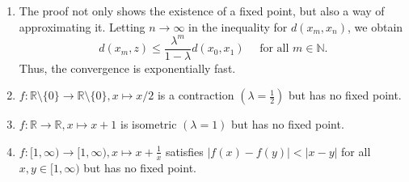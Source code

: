 \documentclass[a4paper]{article}
\begin{document}
\begin{remark}
\begin{enumerate}
    \item The proof not only shows the existence of a fixed point, but also a way of approximating it. Letting $n \rightarrow \infty$ in the inequality for $d\left(x_m, x_n\right)$, we obtain
    \[
    d\left(x_m, z\right) \leqslant \frac{\lambda^m}{1-\lambda} d\left(x_0, x_1\right) \quad \text { for all } m \in \mathbb{N}.
    \]
    Thus, the convergence is exponentially fast.
    \item $f: \mathbb{R} \setminus\{0\} \rightarrow \mathbb{R} \setminus\{0\}, x \mapsto x / 2$ is a contraction $\left(\lambda=\frac{1}{2}\right)$ but has no fixed point.
    \item $f: \mathbb{R} \rightarrow \mathbb{R}, x \mapsto x+1$ is isometric $(\lambda=1)$ but has no fixed point.
    \item $f:[1, \infty) \rightarrow[1, \infty), x \mapsto x+\frac{1}{x}$ satisfies $|f(x)-f(y)|<|x-y|$ for all $x, y \in[1, \infty)$ but has no fixed point.
\end{enumerate}
\end{remark}
\end{document}
